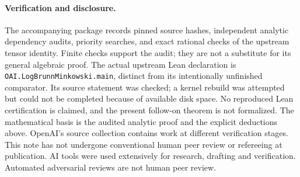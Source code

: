 \documentclass[11pt]{article}
\begin{document}
\paragraph{Verification and disclosure.}
The accompanying package records pinned source hashes, independent analytic dependency audits, priority searches, and exact rational checks of the upstream tensor identity. Finite checks support the audit; they are not a substitute for its general algebraic proof. The actual upstream Lean declaration is \texttt{OAI.LogBrunnMinkowski.}\allowbreak\texttt{main}, distinct from its intentionally unfinished comparator. Its source statement was checked; a kernel rebuild was attempted but could not be completed because of available disk space. No reproduced Lean certification is claimed, and the present follow-on theorem is not formalized. The mathematical basis is the audited analytic proof and the explicit deductions above. OpenAI's source collection contains work at different verification stages. This note has not undergone conventional human peer review or refereeing at publication. AI tools were used extensively for research, drafting and verification. Automated adversarial reviews are not human peer review.
\end{document}
